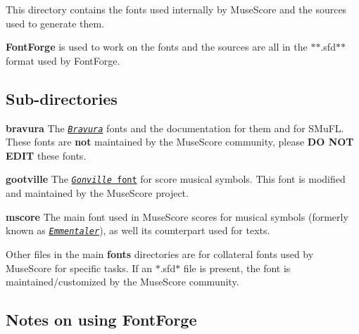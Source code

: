 This directory contains the fonts used internally by Muse\+Score and the sources used to generate them.

{\bfseries Font\+Forge} is used to work on the fonts and the sources are all in the $\ast$$\ast$.sfd$\ast$$\ast$ format used by Font\+Forge.

\subsection*{Sub-\/directories}


\begin{DoxyItemize}
\item {\bfseries bravura} The \href{http://www.smufl.org/fonts/}{\tt {\itshape Bravura}} fonts and the documentation for them and for S\+Mu\+FL. These fonts are {\bfseries not} maintained by the Muse\+Score community, please {\bfseries DO N\+OT E\+D\+IT} these fonts.
\item {\bfseries gootville} The \href{http://www.chiark.greenend.org.uk/~sgtatham/gonville/}{\tt {\itshape Gonville} font} for score musical symbols. This font is modified and maintained by the Muse\+Score project.
\item {\bfseries mscore} The main font used in Muse\+Score scores for musical symbols (formerly known as \href{http://lilypond.org/doc/v2.18/Documentation/notation/the-feta-font}{\tt {\itshape Emmentaler}}), as well its counterpart used for texts.
\end{DoxyItemize}

Other files in the main {\bfseries fonts} directories are for collateral fonts used by Muse\+Score for specific tasks. If an $\ast$.sfd$\ast$ file is present, the font is maintained/customized by the Muse\+Score community.

\subsection*{Notes on using Font\+Forge}



